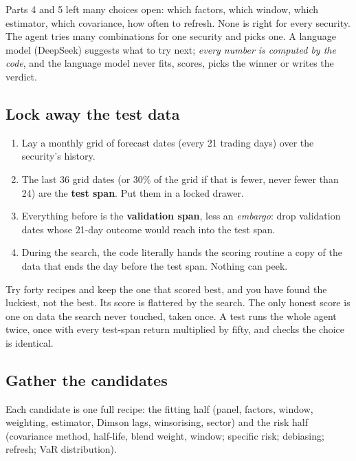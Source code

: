 \documentclass[11pt,a4paper]{article}
\begin{document}
Parts 4 and 5 left many choices open: which factors, which window, which estimator,
which covariance, how often to refresh. None is right for every security. The
agent tries many combinations for one security and picks one. A language model
(DeepSeek) suggests what to try next; \emph{every number is computed by the code},
and the language model never fits, scores, picks the winner or writes the verdict.

\subsection{Lock away the test data}

\begin{method}
\begin{enumerate}[leftmargin=1.4em]
  \item Lay a monthly grid of forecast dates (every 21 trading days) over the security's history.
  \item The last 36 grid dates (or 30\% of the grid if that is fewer, never fewer than 24) are the \textbf{test span}. Put them in a locked drawer.
  \item Everything before is the \textbf{validation span}, less an \emph{embargo}: drop validation dates whose 21-day outcome would reach into the test span.
  \item During the search, the code literally hands the scoring routine a copy of the data that ends the day before the test span. Nothing can peek.
\end{enumerate}
\end{method}

\begin{tip}
Try forty recipes and keep the one that scored best, and you have found the luckiest,
not the best. Its score is flattered by the search. The only honest score is one on
data the search never touched, taken once. A test runs the whole agent twice, once
with every test-span return multiplied by fifty, and checks the choice is identical.
\end{tip}

\subsection{Gather the candidates}

Each candidate is one full recipe: the fitting half (panel, factors, window,
weighting, estimator, Dimson lags, winsorising, sector) and the risk half
(covariance method, half-life, blend weight, window; specific risk; debiasing;
refresh; VaR distribution).
\end{document}
